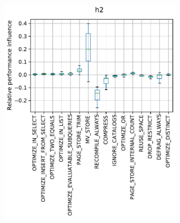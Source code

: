 \begin{figure}
\begin{minipage}{0.33\textwidth}
\begin{subfigure}{\linewidth}
			\vspace{0.0001mm}
		\end{subfigure}
	\end{minipage}
	\begin{minipage}{0.33\textwidth}
		\begin{subfigure}{\linewidth}
			\includegraphics[width=\linewidth]{images/rq2/relative_performance_h2.pdf}

		\end{subfigure}
	\end{minipage}


\end{figure}
